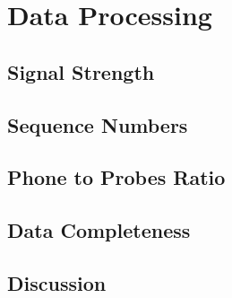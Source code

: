 \chapter{Data Processing}



\section{Signal Strength}

\section{Sequence Numbers}

\section{Phone to Probes Ratio}

\section{Data Completeness}

\section{Discussion}
 
